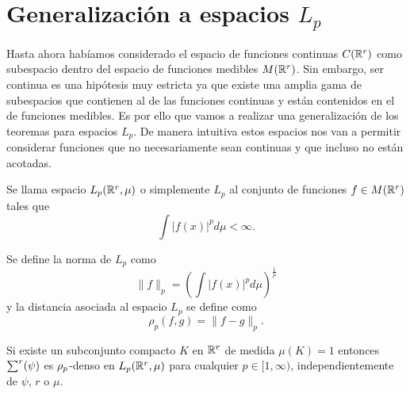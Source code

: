 %
\section{Generalización a espacios $L_p$}  

Hasta ahora habíamos considerado el espacio de funciones continuas 
$C(\mathbb{R}^r)$ 
como subespacio dentro del espacio de funciones medibles $M(\mathbb{R}^r)$. 
Sin embargo, ser continua es una hipótesis muy estricta ya que existe una amplia gama de subespacios que contienen al de 
las funciones continuas y están contenidos en el de funciones medibles. 
Es por ello que vamos a realizar una generalización de los teoremas
para espacios $L_p$. De manera intuitiva estos espacios nos van a 
permitir considerar funciones que no necesariamente sean continuas
y que incluso no están acotadas. 

 \normalmarginpar
\begin{definicion}[Espacios Lp]
    Se llama espacio $L_p(\mathbb{R}^r, \mu)$ o simplemente $L_p$ al conjunto 
    de funciones $f \in M(\mathbb{R}^r)$ tales que 
    \begin{equation}
        \int |f(x)|^p d\mu < \infty. 
    \end{equation}

   
Se define la norma de $L_p$ como 
\begin{equation}
    \| f\|_p 
    =
    \left(\int |f(x)|^p d\mu \right)^\frac{1}{p}
\end{equation}
y la distancia asociada al espacio $L_p$ se define como 
\begin{equation}
    \rho_p(f,g) = \| f-g\|_p.
\end{equation}
\end{definicion}


\begin{corolario}\label{corolario:2_2_rrnn}
    Si existe un subconjunto compacto $K$ en $\mathbb{R}^r$ de medida
    $\mu(K) =1$ entonces $\sum^r (\psi)$ es $\rho_{p}$-denso en $L_p(\mathbb{R}^r, \mu)$
    para cualquier $p \in [1,\infty)$, independientemente de 
    $\psi$, $r$ o $\mu$.
\end{corolario}

